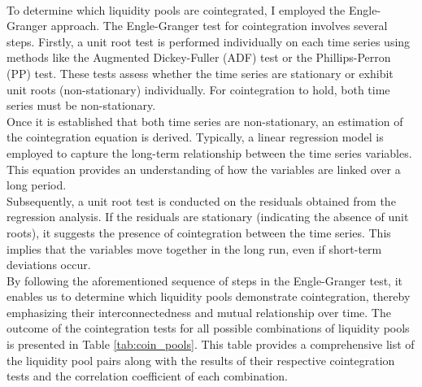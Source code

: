 \\[3mm]
To determine which liquidity pools are cointegrated, I employed the Engle-Granger approach. The Engle-Granger test for cointegration involves several steps. Firstly, a unit root test is performed individually on each time series using methods like the Augmented Dickey-Fuller (ADF) test or the Phillips-Perron (PP) test. These tests assess whether the time series are stationary or exhibit unit roots (non-stationary) individually. For cointegration to hold, both time series must be non-stationary.
\\[3mm]
Once it is established that both time series are non-stationary, an estimation of the cointegration equation is derived. Typically, a linear regression model is employed to capture the long-term relationship between the time series variables. This equation provides an understanding of how the variables are linked over a long period.
\\[3mm]
Subsequently, a unit root test is conducted on the residuals obtained from the regression analysis. If the residuals are stationary (indicating the absence of unit roots), it suggests the presence of cointegration between the time series. This implies that the variables move together in the long run, even if short-term deviations occur.
\\[3mm]
By following the aforementioned sequence of steps in the Engle-Granger test, it enables us to determine which liquidity pools demonstrate cointegration, thereby emphasizing their interconnectedness and mutual relationship over time. The outcome of the cointegration tests for all possible combinations of liquidity pools is presented in Table \ref{tab:coin_pools}. This table provides a comprehensive list of the liquidity pool pairs along with the results of their respective cointegration tests and the correlation coefficient of each combination.
